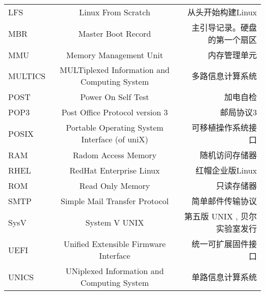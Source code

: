 \begin{landscape}
\begin{center}
\begin{supertabular}{l|c|r}
LFS & Linux From Scratch & 从头开始构建Linux \\
MBR & Master Boot Record & 主引导记录。硬盘的第一个扇区 \\
MMU & Memory Management Unit & 内存管理单元 \\

MULTICS & MULTiplexed Information and Computing System & 多路信息计算系统 \\
POST & Power On Self Test & 加电自检\\
POP3 & Post Office Protocol version 3 & 邮局协议3\\

POSIX & Portable Operating System Interface (of uniX) & 可移植操作系统接口 \\
RAM & Radom Access Memory & 随机访问存储器\\
RHEL & RedHat Enterprise Linux & 红帽企业版Linux\\
ROM & Read Only Memory & 只读存储器\\
SMTP & Simple Mail Transfer Protocol & 简单邮件传输协议 \\


SysV & System V UNIX & 第五版 UNIX , 贝尔实验室发行 \\
UEFI & Unified Extensible Firmware Interface & 统一可扩展固件接口 \\
UNICS & UNiplexed Information and Computing System & 单路信息计算系统\\
\end{supertabular}
\end{center}
\end{landscape}